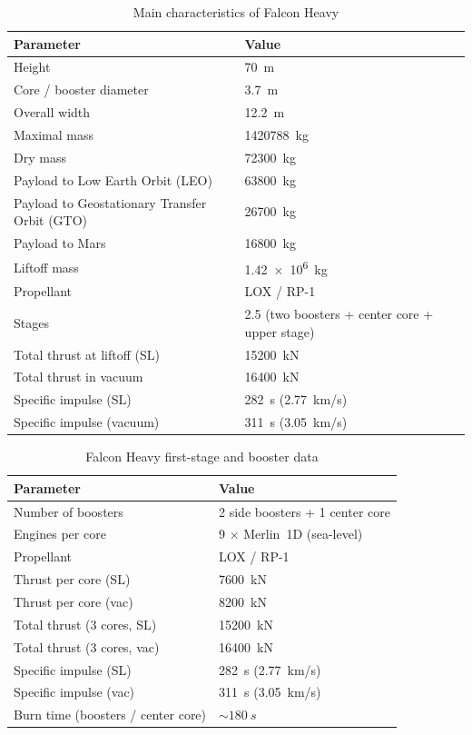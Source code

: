 \documentclass[11pt,a4paper]{article}
\begin{document}
\begin{table}[H]
    \centering
    \caption{Main characteristics of Falcon Heavy}
    \begin{tabular}{l l}
        \hline
        Parameter          & Value \\
        \hline
        Height             & \SI{70}{m} \\
        Core / booster diameter & \SI{3.7}{m} \\
        Overall width      & \SI{12.2}{m} \\
        Maximal mass          & \SI{1420788}{kg}\\
        Dry mass               & \SI{72300}{kg}\\
        Payload to Low Earth Orbit (LEO)   & \SI{63800}{kg} \\
        Payload to Geostationary Transfer Orbit (GTO) & \SI{26700}{kg} \\
        Payload to Mars                    & \SI{16800}{kg} \\
        Liftoff mass       & \SI{1.42e6}{kg} \\
        Propellant         & LOX / RP-1 \\
        Stages             & 2.5 (two boosters + center core + upper stage) \\[2pt]
        Total thrust at liftoff (SL) & \SI{15200}{kN} \\
        Total thrust in vacuum       & \SI{16400}{kN} \\
        Specific impulse (SL)        & \SI{282}{s} \; (\SI{2.77}{km/s}) \\
        Specific impulse (vacuum)    & \SI{311}{s} \; (\SI{3.05}{km/s}) \\
        \hline
    \end{tabular}
\end{table}

\begin{table}[H]
    \centering
    \caption{Falcon Heavy first-stage and booster data}
    \begin{tabular}{l l}
        \hline
        Parameter          & Value \\
        \hline
        Number of boosters & 2 side boosters + 1 center core \\
        Engines per core   & 9 $\times$ Merlin~1D (sea-level) \\
        Propellant         & LOX / RP-1 \\
        Thrust per core (SL) & \SI{7600}{kN} \\
        Thrust per core (vac) & \SI{8200}{kN} \\
        Total thrust (3 cores, SL) & \SI{15200}{kN} \\
        Total thrust (3 cores, vac) & \SI{16400}{kN} \\
        Specific impulse (SL) & \SI{282}{s} \; (\SI{2.77}{km/s}) \\
        Specific impulse (vac) & \SI{311}{s} \; (\SI{3.05}{km/s}) \\
        Burn time (boosters / center core) & $\sim\SI{180}{s}$ \\
        \hline
    \end{tabular}
\end{table}
\end{document}
